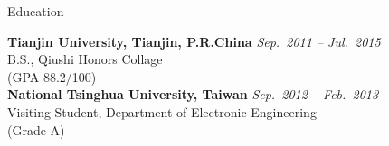 

\begin{rSection}{Education}



{\bf Tianjin University, Tianjin, P.R.China} \hfill {\em Sep.~2011 -- Jul.~2015} \\ 
B.S., Qiushi Honors Collage \\
(GPA 88.2/100)\\
{\bf National Tsinghua University, Taiwan} \hfill {\em Sep.~2012 -- Feb.~2013} \\ 
Visiting Student, Department of Electronic Engineering \\
(Grade A)


\end{rSection}

